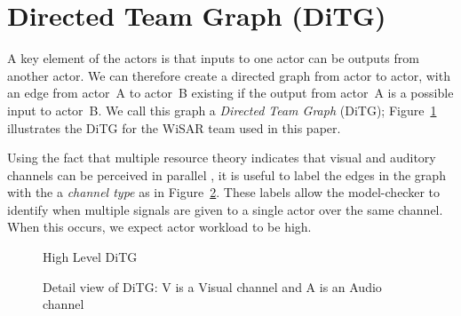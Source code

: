 \section{Directed Team Graph (DiTG)}
A key element of the actors is that inputs to one actor can be outputs from another actor.  We can therefore create a directed graph from actor to actor, with an edge from actor~A to actor~B existing if the output from actor~A is a possible input to actor~B.  We call this graph a {\em Directed Team Graph} (DiTG); Figure~\ref{fig:ditg} illustrates the DiTG for the WiSAR team used in this paper.   

Using the fact that multiple resource theory indicates that visual and auditory channels can be perceived in parallel \cite{wickens2002multiple}, it is useful to label the edges in the graph with the a {\em channel type} as in Figure~\ref{fig:ditg_detail}.  These labels allow the model-checker to identify when multiple signals are given to a single actor over the same channel.  When this occurs, we expect actor workload to be high.


\begin{figure}[hbt]
\center
\setlength{\abovecaptionskip}{1mm}
\setlength{\belowcaptionskip}{1mm}
\setlength{\textfloatsep}{1mm}
\setlength{\floatsep}{1mm}
\caption{High Level DiTG}
\label{fig:ditg}
\end{figure}

\begin{figure}[hbt]
\center
\setlength{\abovecaptionskip}{1mm}
\setlength{\belowcaptionskip}{1mm}
\setlength{\textfloatsep}{1mm}
\setlength{\floatsep}{1mm}
\caption{Detail view of DiTG: V is a Visual channel and A is an Audio channel}
\label{fig:ditg_detail}
\end{figure}

